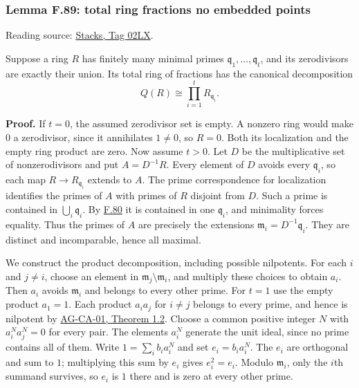 \documentclass[11pt,a4paper,openany]{report}
\begin{document}
\label{AG-RG-S05-algebra-lemma-total-ring-fractions-no-embedded-points}

\subsubsection{Lemma F.89: total ring fractions no embedded points}\label{AG-RG-S05-lemma-f.89-total-ring-fractions-no-embedded-points}

Reading source: \href{https://stacks.math.columbia.edu/tag/02LX}{Stacks, Tag 02LX}.

Suppose a ring \(R\) has finitely many minimal primes \(\mathfrak q_1,\ldots,\mathfrak q_t\), and its zerodivisors are exactly their union. Its total ring of fractions has the canonical decomposition \[
Q(R)\cong\prod_{i=1}^t R_{\mathfrak q_i}.
\]

\textbf{Proof.} If \(t=0\), the assumed zerodivisor set is empty. A nonzero ring would make \(0\) a zerodivisor, since it annihilates \(1\ne0\), so \(R=0\). Both its localization and the empty ring product are zero. Now assume \(t>0\). Let \(D\) be the multiplicative set of nonzerodivisors and put \(A=D^{-1}R\). Every element of \(D\) avoids every \(\mathfrak q_i\), so each map \(R\to R_{\mathfrak q_i}\) extends to \(A\). The prime correspondence for localization identifies the primes of \(A\) with primes of \(R\) disjoint from \(D\). Such a prime is contained in \(\bigcup_i\mathfrak q_i\). By \hyperref[AG-RG-S05-algebra-lemma-silly]{F.80} it is contained in one \(\mathfrak q_i\), and minimality forces equality. Thus the primes of \(A\) are precisely the extensions \(\mathfrak m_i=D^{-1}\mathfrak q_i\). They are distinct and incomparable, hence all maximal.

We construct the product decomposition, including possible nilpotents. For each \(i\) and \(j\ne i\), choose an element in \(\mathfrak m_j\setminus\mathfrak m_i\), and multiply these choices to obtain \(a_i\). Then \(a_i\) avoids \(\mathfrak m_i\) and belongs to every other prime. For \(t=1\) use the empty product \(a_1=1\). Each product \(a_i a_j\) for \(i\ne j\) belongs to every prime, and hence is nilpotent by \href{https://github.com/KokunoYumeto/open-math-courses/blob/d02d0a3669f42579db037cd44de1d113fdd770a1/docs/courses/AG-CA/src/spectra-of-rings.md}{AG-CA-01, Theorem 1.2}. Choose a common positive integer \(N\) with \(a_i^N a_j^N=0\) for every pair. The elements \(a_i^N\) generate the unit ideal, since no prime contains all of them. Write \(1=\sum_i b_i a_i^N\) and set \(e_i=b_i a_i^N\). The \(e_i\) are orthogonal and sum to \(1\); multiplying this sum by \(e_i\) gives \(e_i^2=e_i\). Modulo \(\mathfrak m_i\), only the \(i\)th summand survives, so \(e_i\) is \(1\) there and is zero at every other prime.
\end{document}
